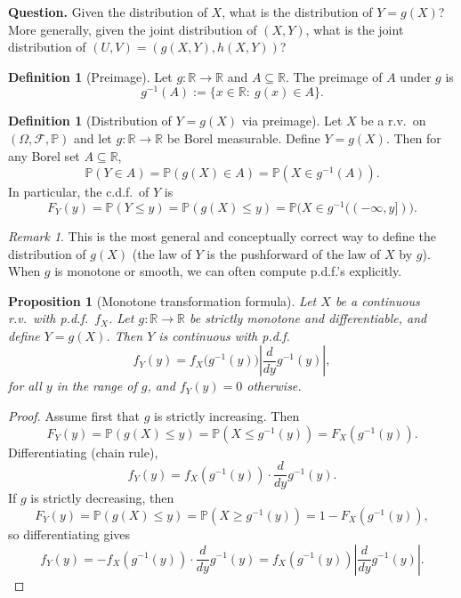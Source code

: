 \documentclass[11pt]{article}
\theoremstyle{plain}
\newtheorem{proposition}[theorem]{Proposition}
\theoremstyle{definition}
\newtheorem{definition}[theorem]{Definition}
\theoremstyle{remark}
\newtheorem{remark}[theorem]{Remark}
\begin{document}
	\textbf{Question.} Given the distribution of \(X\), what is the distribution of \(Y=g(X)\)?  
	More generally, given the joint distribution of \((X,Y)\), what is the joint distribution of
	\((U,V)=(g(X,Y),h(X,Y))\)?
	
	
	
	\begin{definition}[Preimage]
		Let \(g:\mathbb{R}\to\mathbb{R}\) and \(A\subseteq\mathbb{R}\). The preimage of \(A\) under \(g\) is
		\[
		g^{-1}(A):=\{x\in\mathbb{R}:\ g(x)\in A\}.
		\]
	\end{definition}
	
	\begin{definition}[Distribution of \(Y=g(X)\) via preimage]
		Let \(X\) be a r.v.\ on \((\Omega,\mathcal{F},\mathbb{P})\) and let \(g:\mathbb{R}\to\mathbb{R}\) be Borel measurable.
		Define \(Y=g(X)\).
		Then for any Borel set \(A\subseteq\mathbb{R}\),
		\[
		\mathbb{P}(Y\in A)=\mathbb{P}(g(X)\in A)=\mathbb{P}(X\in g^{-1}(A)).
		\]
		In particular, the c.d.f.\ of \(Y\) is
		\[
		F_Y(y)=\mathbb{P}(Y\le y)=\mathbb{P}(g(X)\le y)=\mathbb{P}\bigl(X\in g^{-1}((-\infty,y])\bigr).
		\]
	\end{definition}
	
	\begin{remark}
		This is the most general and conceptually correct way to define the distribution of \(g(X)\)
		(the law of \(Y\) is the pushforward of the law of \(X\) by \(g\)).
		When \(g\) is monotone or smooth, we can often compute p.d.f.'s explicitly.
	\end{remark}
	
	
	\begin{proposition}[Monotone transformation formula]
		Let \(X\) be a continuous r.v.\ with p.d.f.\ \(f_X\).
		Let \(g:\mathbb{R}\to\mathbb{R}\) be strictly monotone and differentiable, and define \(Y=g(X)\).
		Then \(Y\) is continuous with p.d.f.
		\[
		f_Y(y)=f_X\!\bigl(g^{-1}(y)\bigr)\left|\frac{d}{dy}g^{-1}(y)\right|,
		\]
		for all \(y\) in the range of \(g\), and \(f_Y(y)=0\) otherwise.
	\end{proposition}
	
	\begin{proof}
		Assume first that \(g\) is strictly increasing. Then
		\[
		F_Y(y)=\mathbb{P}(g(X)\le y)=\mathbb{P}(X\le g^{-1}(y))=F_X(g^{-1}(y)).
		\]
		Differentiating (chain rule),
		\[
		f_Y(y)=f_X(g^{-1}(y))\cdot \frac{d}{dy}g^{-1}(y).
		\]
		If \(g\) is strictly decreasing, then
		\[
		F_Y(y)=\mathbb{P}(g(X)\le y)=\mathbb{P}(X\ge g^{-1}(y))=1-F_X(g^{-1}(y)),
		\]
		so differentiating gives
		\[
		f_Y(y)=-f_X(g^{-1}(y))\cdot \frac{d}{dy}g^{-1}(y)
		=f_X(g^{-1}(y))\left|\frac{d}{dy}g^{-1}(y)\right|.
		\]
	\end{proof}
	
\end{document}
